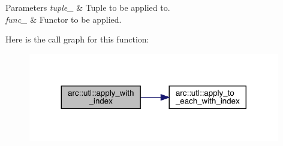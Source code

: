 \begin{DoxyParams}{Parameters}
{\em tuple\+\_\+} & Tuple to be applied to. \\
\hline
{\em func\+\_\+} & Functor to be applied. \\
\hline
\end{DoxyParams}
Here is the call graph for this function\+:\nopagebreak
\begin{figure}[H]
\begin{center}
\leavevmode
\includegraphics[width=311pt]{namespacearc_1_1utl_ae57e12a4fd6beeb3a1a40bfd461c3a87_cgraph}
\end{center}
\end{figure}
